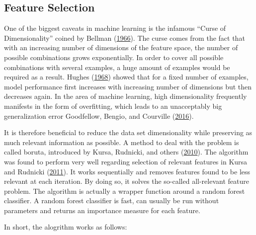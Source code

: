 \documentclass[
  11pt,
  a4paper,
  DIV=12,captions=tableheading,oneside,titlepage=firstiscover,abstracton]{scrreprt}
\begin{document}
\hypertarget{methods-feature-selection}{%
\subsection{Feature Selection}\label{methods-feature-selection}}

One of the biggest caveats in machine learning is the infamous ``Curse of Dimensionality'' coined by Bellman (\protect\hyperlink{ref-bellman1966dynamic}{1966}). The curse comes from the fact that with an increasing number of dimensions of the feature space, the number of possible combinations grows exponentially. In order to cover all possible combinations with several examples, a huge amount of examples would be required as a result. Hughes (\protect\hyperlink{ref-hughes1968mean}{1968}) showed that for a fixed number of examples, model performance first increases with increasing number of dimensions but then decreases again. In the area of machine learning, high dimensionality frequently manifests in the form of overfitting, which leads to an unacceptably big generalization error Goodfellow, Bengio, and Courville (\protect\hyperlink{ref-Goodfellow-et-al-2016}{2016}).

It is therefore beneficial to reduce the data set dimensionality while preserving as much relevant information as possible. A method to deal with the problem is called boruta, introduced by Kursa, Rudnicki, and others (\protect\hyperlink{ref-kursa2010boruta}{2010}). The algorithm was found to perform very well regarding selection of relevant features in Kursa and Rudnicki (\protect\hyperlink{ref-kursa2011boruta}{2011}). It works sequentially and removes features found to be less relevant at each iteration. By doing so, it solves the so-called all-relevant feature problem. The algorithm is actually a wrapper function around a random forest classifier. A random forest classifier is fast, can usually be run without parameters and returns an importance measure for each feature.

In short, the alogrithm works as follows:
\end{document}
